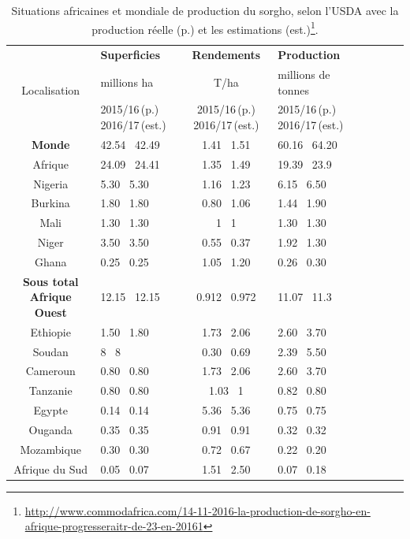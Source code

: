\documentclass[a4paper,11pt]{article}
\begin{document}
\begin{table}
  \begin{center}
    \begin{tabular}{|c|p{4.5cm}|c|p{4.5cm}|c|p{4.5cm}|c|p{4.5cm}|}
      \hline
      \multirow{3}{*}{Localisation} & \textbf{Superficies}      & \textbf{Rendements}  & \textbf{Production}          \\ \cline{2-3}
      & millions ha                 & T/ha                 & millions de tonnes          \\ \cline{2-3}
      & 2015/16\,(p.) 2016/17\,(est.) & 2015/16\,(p.)  2016/17\,(est.) & 2015/16\,(p.) 2016/17\,(est.)        \\ \hline
      \multirow{1}{*}{\textbf{Monde}} & 42.54  \, 42.49 & 1.41  \, 1.51 & 60.16 \, 64.20 \\ \hline
      \multirow{1}{*}{Afrique} & 24.09 \, 24.41 & 1.35 \, 1.49 & 19.39 \, 23.9 \\ \hline
      \multirow{1}{*}{Nigeria} & 5.30  \, 5.30 & 1.16  \, 1.23 & 6.15 \, 6.50 \\ \hline
      \multirow{1}{*}{Burkina} & 1.80  \, 1.80 & 0.80  \, 1.06 & 1.44 \, 1.90 \\ \hline
      \multirow{1}{*}{Mali} & 1.30  \, 1.30 & 1  \, 1  & 1.30  \, 1.30  \\ \hline
      \multirow{1}{*}{Niger} & 3.50  \, 3.50 & 0.55  \, 0.37  & 1.92  \, 1.30  \\ \hline
      \multirow{1}{*}{Ghana} & 0.25  \, 0.25 & 1.05  \, 1.20  & 0.26  \, 0.30  \\ \hline
      \multirow{1}{*}{\textbf{Sous total Afrique Ouest}} & 12.15  \, 12.15 & 0.912 \, 0.972  & 11.07  \, 11.3  \\ \hline
      \multirow{1}{*}{Ethiopie} & 1.50  \, 1.80 & 1.73  \, 2.06  & 2.60  \, 3.70  \\ \hline
      \multirow{1}{*}{Soudan} & 8  \, 8 & 0.30  \, 0.69  & 2.39  \, 5.50  \\ \hline
      \multirow{1}{*}{Cameroun} & 0.80  \, 0.80 & 1.73  \, 2.06  & 2.60  \, 3.70  \\ \hline
      \multirow{1}{*}{Tanzanie} & 0.80  \, 0.80 & 1.03  \, 1  & 0.82  \, 0.80  \\ \hline
      \multirow{1}{*}{Egypte} & 0.14  \, 0.14 & 5.36  \, 5.36  & 0.75  \, 0.75  \\ \hline
      \multirow{1}{*}{Ouganda} & 0.35  \, 0.35 & 0.91  \, 0.91  & 0.32  \, 0.32  \\ \hline
      \multirow{1}{*}{Mozambique} & 0.30  \, 0.30 & 0.72  \, 0.67  & 0.22  \, 0.20  \\ \hline
      \multirow{1}{*}{Afrique du Sud} & 0.05  \, 0.07 & 1.51  \, 2.50  & 0.07  \, 0.18  \\ \hline
    \end{tabular}
    \caption{Situations africaines et mondiale de production du
      sorgho, selon l'USDA avec la production réelle (p.) et les
      estimations (est.)\protect\footnote{\protect\url{http://www.commodafrica.com/14-11-2016-la-production-de-sorgho-en-afrique-progresseraitr-de-23-en-20161}}.}
  \end{center}
\end{table}
\end{document}
